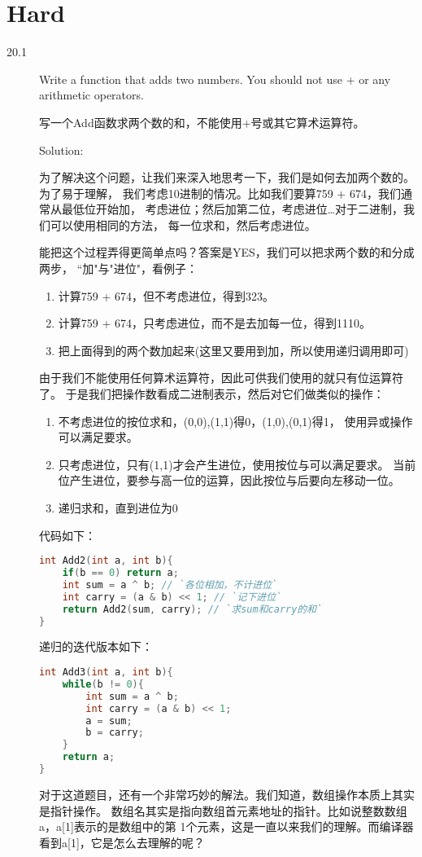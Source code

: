 \chapter{Hard}

\begin{description}
\item[20.1] Write a function that adds two numbers. You should not use + or any arithmetic operators.

写一个Add函数求两个数的和，不能使用+号或其它算术运算符。

Solution:

为了解决这个问题，让我们来深入地思考一下，我们是如何去加两个数的。为了易于理解， 我们考虑10进制的情况。比如我们要算759 + 674，我们通常从最低位开始加， 考虑进位；然后加第二位，考虑进位…对于二进制，我们可以使用相同的方法， 每一位求和，然后考虑进位。

能把这个过程弄得更简单点吗？答案是YES，我们可以把求两个数的和分成两步， “加"与"进位"，看例子：
\begin{enumerate}
\itemsep=-3pt
\item 计算759 + 674，但不考虑进位，得到323。
\item 计算759 + 674，只考虑进位，而不是去加每一位，得到1110。
\item 把上面得到的两个数加起来(这里又要用到加，所以使用递归调用即可)
\end{enumerate}
由于我们不能使用任何算术运算符，因此可供我们使用的就只有位运算符了。 于是我们把操作数看成二进制表示，然后对它们做类似的操作：
\begin{enumerate}
\itemsep=-3pt
\item 不考虑进位的按位求和，(0,0),(1,1)得0，(1,0),(0,1)得1， 使用异或操作可以满足要求。
\item 只考虑进位，只有(1,1)才会产生进位，使用按位与可以满足要求。 当前位产生进位，要参与高一位的运算，因此按位与后要向左移动一位。
\item 递归求和，直到进位为0
\end{enumerate}
代码如下：
\begin{lstlisting}[language=C++]
int Add2(int a, int b){
    if(b == 0) return a;
    int sum = a ^ b; // `各位相加，不计进位`
    int carry = (a & b) << 1; // `记下进位`
    return Add2(sum, carry); // `求sum和carry的和`
}
\end{lstlisting}
递归的迭代版本如下：
\begin{lstlisting}[language=C++]
int Add3(int a, int b){
    while(b != 0){
        int sum = a ^ b;
        int carry = (a & b) << 1;
        a = sum;
        b = carry;
    }
    return a;
}
\end{lstlisting}
对于这道题目，还有一个非常巧妙的解法。我们知道，数组操作本质上其实是指针操作。 数组名其实是指向数组首元素地址的指针。比如说整数数组a，a[1]表示的是数组中的第 1个元素，这是一直以来我们的理解。而编译器看到a[1]，它是怎么去理解的呢？


\end{description}

